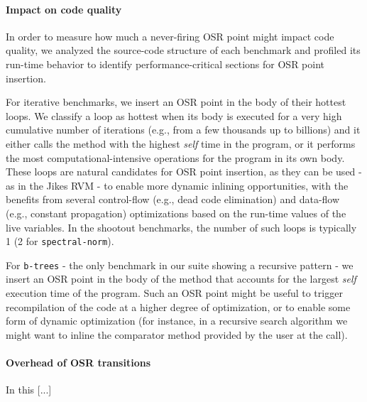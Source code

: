 \paragraph{Impact on code quality}
In order to measure how much a never-firing OSR point might impact code quality, we analyzed the source-code structure of each benchmark and profiled its run-time behavior to identify performance-critical sections for OSR point insertion.

For iterative benchmarks, we insert an OSR point in the body of their hottest loops. We classify a loop as hottest when its body is executed for a very high cumulative number of iterations (e.g., from a few thousands up to billions) and it either calls the method with the highest {\em self} time in the program, or it performs the most computational-intensive operations for the program in its own body. These loops are natural candidates for OSR point insertion, as they can be used - as in the Jikes RVM - to enable more dynamic inlining opportunities, with the benefits from several control-flow (e.g., dead code elimination) and data-flow (e.g., constant propagation) optimizations based on the run-time values of the live variables. In the shootout benchmarks, the number of such loops is typically 1 (2 for {\tt spectral-norm}).

For {\tt b-trees} - the only benchmark in our suite showing a recursive pattern - we insert an OSR point in the body of the method that accounts for the largest {\em self} execution time of the program. Such an OSR point might be useful to trigger recompilation of the code at a higher degree of optimization, or to enable some form of dynamic optimization (for instance, in a recursive search algorithm we might want to inline the comparator method provided by the user at the call).
  
\paragraph{Overhead of OSR transitions}

In this [...]

